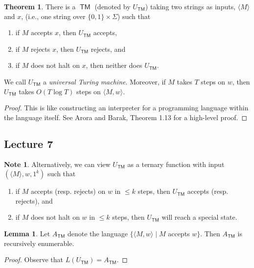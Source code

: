 \documentclass[10pt,letterpaper,cm]{nupset}
\theoremstyle{definition}
\newtheorem{note}{Note}
\newtheorem{theorem}{Theorem}
\newtheorem{lemma}{Lemma}
\newcommand{\1}{\mathbf{1}}
\newcommand{\0}{\vec 0}
\DeclareMathOperator{\TM}{\mathsf{TM}}
\begin{document}
\begin{theorem}
 There is a $\TM$ (denoted by $U_{\TM}$) taking two strings as inputs, $\langle M \rangle$ and $x$, (i.e., one string over $\{0,1\} \times \Sigma$) such that
 \begin{enumerate}
 \item if $M$ accepts $x$, then $U_{\TM}$ accepts,
 \item if $M$ rejects $x$, then $U_{\TM}$ rejects, and
 \item if $M$ does not halt on $x$, then neither does $U_{\TM}$.
 \end{enumerate} We call $U_{\TM}$ a \textit{universal Turing machine}. Moreover, if $M$ takes $T$ steps on $w$, then $U_{\TM}$ takes $O(T \log{T})$ steps on $\langle M, w \rangle$.
\end{theorem}
\begin{proof}
This is like constructing an interpreter for a programming language within the language itself. See Arora and Barak, Theorem 1.13 for a high-level proof.
\end{proof}

\subsection{Lecture 7}

\begin{note}
Alternatively, we can view $U_{\TM}$ as a ternary function with input $(\langle M \rangle,  w, 1^k)$ such that
\begin{enumerate}
\item if $M$ accepts (resp. rejects) on $w$ in $\leq k$ steps, then $U_{\TM}$ accepts (resp. rejects), and
\item if $M$ does not halt on $w$ in $\leq k$ steps, then $U_{\TM}$ will reach a special state.
\end{enumerate}
\end{note}

\begin{lemma}
Let $A_{\TM}$ denote the language $\{ \langle M, w \rangle \mid M$ accepts $w\}$. Then $A_{\TM}$ is recursively enumerable.
\end{lemma}
\begin{proof}
Observe that $L(U_{\TM}) = A_{\TM}$.
\end{proof}
\end{document}
